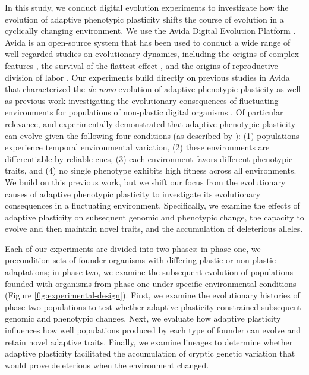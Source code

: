 \documentclass[utf8]{frontiersSCNS} %
\begin{document}
\begin{raggedbottom}
In this study, we conduct digital evolution experiments to investigate how the evolution of adaptive phenotypic plasticity shifts the course of evolution in a cyclically changing environment.
We use the Avida Digital Evolution Platform \citep{ofria_avida:_2009}.
Avida is an open-source system that has been used to conduct a wide range of well-regarded studies on evolutionary dynamics, including
the origins of complex features \citep{lenski_evolutionary_2003},
the survival of the flattest effect \citep{wilke_evolution_2001},
and the origins of reproductive division of labor \citep{goldsby_evolutionary_2014}.
Our experiments build directly on previous studies in Avida that characterized the \textit{de novo} evolution of adaptive phenotypic plasticity \citep{clune_investigating_2007,lalejini_evolutionary_2016} as well as previous work investigating the evolutionary consequences of fluctuating environments for populations of non-plastic digital organisms \citep{li_digital_2004,canino-koning_fluctuating_2019}.
Of particular relevance, \cite{clune_investigating_2007} and \cite{lalejini_evolutionary_2016} experimentally demonstrated that adaptive phenotypic plasticity can evolve given the following four conditions (as described by \citealt{ghalambor_behavior_2010}):
(1) populations experience temporal environmental variation,
(2) these environments are differentiable by reliable cues,
(3) each environment favors different phenotypic traits,
and (4) no single phenotype exhibits high fitness across all environments.
We build on this previous work, but we shift our focus from the evolutionary causes of adaptive phenotypic plasticity to investigate its evolutionary consequences in a fluctuating environment.
Specifically, we examine the effects of adaptive plasticity on subsequent genomic and phenotypic change, the capacity to evolve and then maintain novel traits, and the accumulation of deleterious alleles.

Each of our experiments are divided into two phases: in phase one, we precondition sets of founder organisms with differing plastic or non-plastic adaptations;
in phase two, we examine the subsequent evolution of populations founded with organisms from phase one under specific environmental conditions (Figure \ref{fig:experimental-design}).
First, we examine the evolutionary histories of phase two populations to test whether adaptive plasticity constrained subsequent genomic and phenotypic changes.
Next, we evaluate how adaptive plasticity influences how well populations produced by each type of founder can evolve and retain novel adaptive traits.
Finally, we examine lineages to determine whether adaptive plasticity facilitated the accumulation of cryptic genetic variation that would prove deleterious when the environment changed.


\end{raggedbottom}
\end{document}
